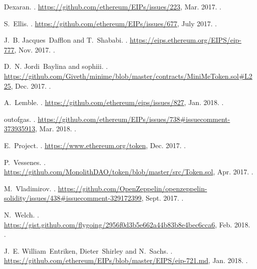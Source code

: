\begin{thebibliography}{10}
Dexaran.
.
\newblock \url{https://github.com/ethereum/EIPs/issues/223}, Mar. 2017.
.

S.~Ellis.
.
\newblock \url{https://github.com/ethereum/EIPs/issues/677}, July 2017.
.

J.~B. Jacques~Dafflon and T.~Shababi.
.
\newblock \url{https://eips.ethereum.org/EIPS/eip-777}, Nov. 2017.
.

D.~N. Jordi~Baylina and sophiii.
.
\newblock
  \url{https://github.com/Giveth/minime/blob/master/contracts/MiniMeToken.sol\#L225},
  Dec. 2017.
.

A.~Lemble.
.
\newblock \url{https://github.com/ethereum/eips/issues/827}, Jan. 2018.
.

outofgas.
.
\newblock
  \url{https://github.com/ethereum/EIPs/issues/738\#issuecomment-373935913},
  Mar. 2018.
.

E.~Project.
.
\newblock \url{https://www.ethereum.org/token}, Dec. 2017.
.

P.~Vessenes.
.
\newblock \url{https://github.com/MonolithDAO/token/blob/master/src/Token.sol},
  Apr. 2017.
.

M.~Vladimirov.
.
\newblock
  \url{https://github.com/OpenZeppelin/openzeppelin-solidity/issues/438\#issuecomment-329172399},
  Sept. 2017.
.

N.~Welch.
.
\newblock
  \url{https://gist.github.com/flygoing/2956f0d3b5e662a44b83b8e4bec6cca6}, Feb.
  2018.
.

J.~E. William~Entriken, Dieter~Shirley and N.~Sachs.
.
\newblock \url{https://github.com/ethereum/EIPs/blob/master/EIPS/eip-721.md},
  Jan. 2018.
.


\end{thebibliography}
